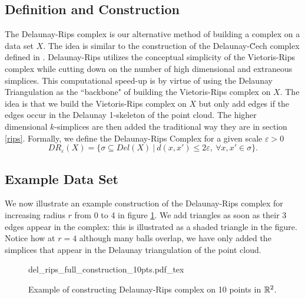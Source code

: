 \documentclass[letterpaper,titlepage]{article}
\newcommand{\incfig}[1]{%
    {#1.pdf_tex}
}
\begin{document}
\subsection{Definition and Construction} \label{del-rips:def}
The Delaunay-Rips complex is our alternative method of building a complex on a data set $X$. The idea is similar to the construction of the Delaunay-\u Cech complex defined in \cite{Bauer_2016}. Delaunay-Rips utilizes the conceptual simplicity of the Vietoris-Rips complex while cutting down on the number of high dimensional and extraneous simplices. This computational speed-up is by virtue of using the Delaunay Triangulation as the ``backbone" of building the Vietoris-Rips complex on $X$. The idea is that we build the Vietoris-Rips complex on $X$ but only add edges if the edges occur in the Delaunay 1-skeleton of the point cloud. The higher dimensional $k$-simplices are then added the traditional way they are in section \ref{rips}. Formally, we define the Delaunay-Rips Complex for a given scale $\varepsilon>0$
$$DR_{\varepsilon}(X) = \{\sigma \subseteq Del(X)\ |\ d(x,x') \leq 2\varepsilon,\ \forall x,x' \in \sigma\}.$$


\subsection{Example Data Set}
We now illustrate an example construction of the Delaunay-Rips complex for increasing radius $r$ from 0 to 4 in figure \ref{fig:example_del_rips_10pts}. We add triangles as soon as their 3 edges appear in the complex: this is illustrated as a shaded triangle in the figure. Notice how at $r=4$ although many balls overlap, we have only added the simplices that appear in the Delaunay triangulation of the point cloud.


\begin{figure}[ht!]
    \centering
    \def\svgwidth{\textwidth}
    \incfig{del_rips_full_construction_10pts}
    \caption{Example of constructing Delaunay-Rips complex on 10 points in $\mathbb{R}^2$.}
    \label{fig:example_del_rips_10pts}
\end{figure}
\end{document}
